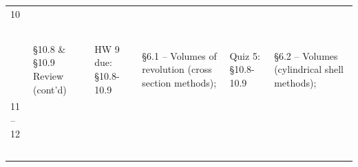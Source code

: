 \documentclass[11pt]{article}
\begin{document}
\begin{table}[ht!]
{\begin{tabular}{ | l | l | l | l | l | l |}
10 & \begin{minipage}{0.18\textwidth}
{\bf July 19}\\
\end{minipage}
& \begin{minipage}{.18\textwidth}
{\bf July 20}\\
\end{minipage}
& \begin{minipage}{.18\textwidth}
{\bf July 21}\\
\end{minipage}
& \begin{minipage}{.18\textwidth}
{\bf July 22}\\
\end{minipage}
& \begin{minipage}{.18\textwidth}
{\bf July 23}\\
\end{minipage}\\

 & \begin{minipage}{0.18\textwidth}
      \S 10.8 \& \S10.9 Review (cont'd)
\end{minipage}
& \begin{minipage}{.18\textwidth}
HW 9 due: \S 10.8-10.9
\end{minipage}
& \begin{minipage}{.18\textwidth}
     \S6.1 -- Volumes of revolution (cross section methods);
\end{minipage}
& \begin{minipage}{.18\textwidth}
Quiz 5: \S10.8-10.9
\end{minipage}
& \begin{minipage}{.18\textwidth}
     \S6.2 -- Volumes (cylindrical shell methods);
\end{minipage}\\
\hline

11 --12 & \begin{minipage}{0.18\textwidth}
{\bf July 26}\\
\end{minipage}
& \begin{minipage}{.18\textwidth}
{\bf July 27}\\
\end{minipage}
& \begin{minipage}{.18\textwidth}
{\bf July 28}\\
\end{minipage}
& \begin{minipage}{.18\textwidth}
{\bf July 29}\\
\end{minipage}
& \begin{minipage}{.18\textwidth}
{\bf July 30}\\
\end{minipage}\\


\end{tabular}}
\end{table}
\end{document}
